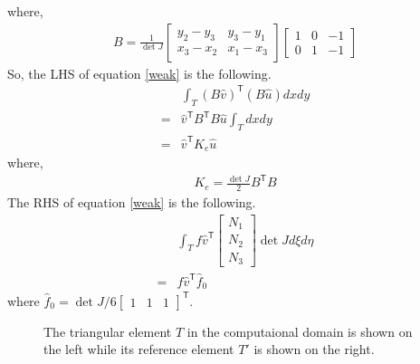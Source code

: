 \documentclass{article}
\begin{document}
where,
\begin{align*}
	B = \frac{1}{\det J} 
	\begin{bmatrix} y_2 - y_3 & y_3 - y_1 \\ x_3 - x_2 & x_1 - x_3 \end{bmatrix}
	\begin{bmatrix} 1 & 0 & -1 \\ 0 & 1 & -1 \end{bmatrix}
\end{align*}
So, the LHS of equation \ref{weak} is the following.
\begin{align*}
	& \int_T (B\hat{v})^{\mathsf{T}} (B\hat{u}) dxdy \\
	=& \hat{v}^{\mathsf{T}} B^{\mathsf{T}}B \hat{u} \int_T dxdy \\
	=& \hat{v}^{\mathsf{T}} K_e \hat{u}
\end{align*}
where,
\begin{align*}
	K_e = \frac{\det J}{2} B^{\mathsf{T}}B
\end{align*}
The RHS of equation \ref{weak} is the following.
\begin{align*}
	& \int_T f \hat{v}^{\mathsf{T}} \begin{bmatrix} N_1 \\ N_2 \\ N_3 \end{bmatrix} \det J d\xi d\eta \\
		= & f \hat{v}^{\mathsf{T}} \hat{f}_0 
\end{align*}
where $ \hat{f}_0 = \det J/6 \begin{bmatrix} 1 & 1 & 1 \end{bmatrix}^{\mathsf{T}}$.

\begin{figure}
\centering
{}
\caption{
  The triangular element $T$ in the computaional domain
  is shown on the left
  while its reference element $T'$ 
  is shown on the right.
  }
\label{elems}
\end{figure}
\end{document}
